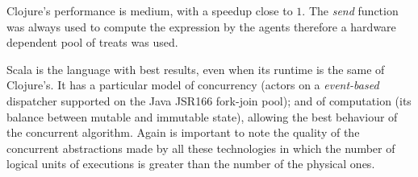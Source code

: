 Clojure's performance is medium, with a speedup close to $1$. The {\em send} function was always used to compute the expression by the agents therefore a hardware dependent pool of treats was used.

Scala is the language with best results, even when its runtime is the same of Clojure's. It has a particular model of concurrency (actors on a {\em event-based} dispatcher supported on the Java JSR166 fork-join pool); and of computation (its balance between mutable and immutable state), allowing the best behaviour of the concurrent algorithm. Again is important to note the quality of the concurrent abstractions made by all these technologies in which the number of logical units of executions is greater than the number of the physical ones.


